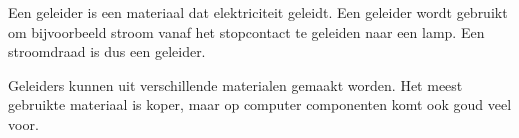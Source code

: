 Een geleider is een materiaal dat elektriciteit geleidt. Een geleider wordt gebruikt om bijvoorbeeld stroom vanaf het stopcontact te geleiden naar een lamp. Een stroomdraad is dus een geleider.

Geleiders kunnen uit verschillende materialen gemaakt worden. Het meest gebruikte materiaal is koper, maar op computer componenten komt ook goud veel voor.
